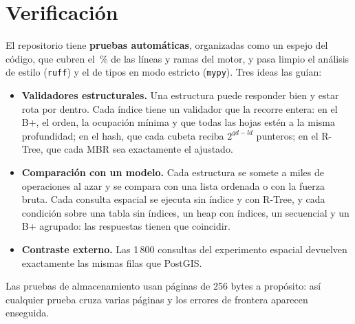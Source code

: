 \section{Verificación}

El repositorio tiene \textbf{\totalpruebas{} pruebas automáticas}, organizadas como un
espejo del código, que cubren el \coberturapruebas{}\,\% de las líneas y ramas del motor,
y pasa limpio el análisis de estilo (\texttt{ruff}) y el de tipos en modo estricto
(\texttt{mypy}). Tres ideas las guían:

\begin{itemize}[nosep, leftmargin=*]
  \item \textbf{Validadores estructurales.} Una estructura puede responder bien y estar
        rota por dentro. Cada índice tiene un validador que la recorre entera: en el B+, el
        orden, la ocupación mínima y que todas las hojas estén a la misma profundidad; en
        el hash, que cada cubeta reciba $2^{gd-ld}$ punteros; en el R-Tree, que cada MBR
        sea exactamente el ajustado.
  \item \textbf{Comparación con un modelo.} Cada estructura se somete a miles de
        operaciones al azar y se compara con una lista ordenada o con la fuerza bruta. Cada
        consulta espacial se ejecuta sin índice y con R-Tree, y cada condición sobre una
        tabla sin índices, un heap con índices, un secuencial y un B+ agrupado: las
        respuestas tienen que coincidir.
  \item \textbf{Contraste externo.} Las 1\,800 consultas del experimento espacial devuelven
        exactamente las mismas filas que PostGIS.
\end{itemize}

Las pruebas de almacenamiento usan páginas de 256 bytes a propósito: así cualquier prueba
cruza varias páginas y los errores de frontera aparecen enseguida.
